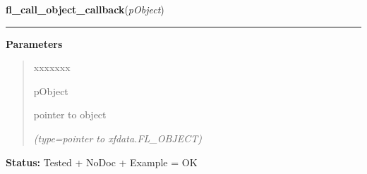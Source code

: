 \hspace{.8\funcindent}\begin{boxedminipage}{\funcwidth}

    \raggedright \textbf{fl\_call\_object\_callback}(\textit{pObject})

    \vspace{-1.5ex}

    \rule{\textwidth}{0.5\fboxrule}
\setlength{\parskip}{2ex}
\setlength{\parskip}{1ex}
      \textbf{Parameters}
      \vspace{-1ex}

      \begin{quote}
        \begin{Ventry}{xxxxxxx}

          \item[pObject]

          pointer to object

            {\it (type=pointer to xfdata.FL\_OBJECT)}

        \end{Ventry}

      \end{quote}

\textbf{Status:} Tested + NoDoc + Example = OK



    \end{boxedminipage}

    \label{xformslib:library:fl_set_object_prehandler}

    \vspace{0.5ex}

